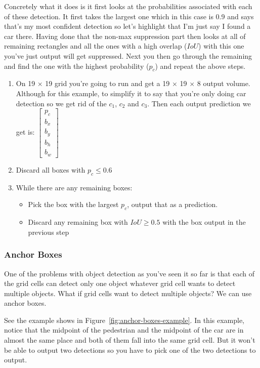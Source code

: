 \documentclass[UTF8]{article}
\begin{document}
Concretely what it does is it first looks at the probabilities associated with each of these
detection. It first takes the largest one which in this case is 0.9 and says that's my most
confident detection so let's highlight that I'm just say I found a car there. Having done that the
non-max suppression part then looks at all of remaining rectangles and all the ones with a high
overlap ($IoU$) with this one you've just output will get suppressed. Next you then go through the
remaining and find the one with the highest probability ($p_c$) and repeat the above steps.

\begin{enumerate}
    \item On 19 $\times$ 19 grid you're going to run and get a 19 $\times$ 19 $\times$ 8 output
    volume. Although for this example, to simplify it to say that you're only doing car detection
    so we get rid of the $c_1$, $c_2$ and $c_3$. Then each output prediction we get is:
    $\displaystyle \left[\begin{array}{c} p_c \\ b_x \\ b_y \\ b_h \\ b_w \end{array}\right]$
    \item Discard all boxes with $p_c \leq 0.6$
    \item While there are any remaining boxes:
    \begin{itemize}
        \item Pick the box with the largest $p_c$, output that as a prediction.
        \item Discard any remaining box with $IoU \geq 0.5$ with the box output in the previous
        step
    \end{itemize}
\end{enumerate}

\subsubsection{Anchor Boxes}
One of the problems with object detection as you've seen it so far is that each of the grid cells
can detect only one object whatever grid cell wants to detect multiple objects. What if grid cells
want to detect multiple objects? We can use anchor boxes.

See the example shows in Figure~\ref{fig:anchor-boxes-example}. In this example, notice that the
midpoint of the pedestrian and the midpoint of the car are in almost the same place and both of
them fall into the same grid cell. But it won't be able to output two detections so you have to pick
one of the two detections to output.
\end{document}
